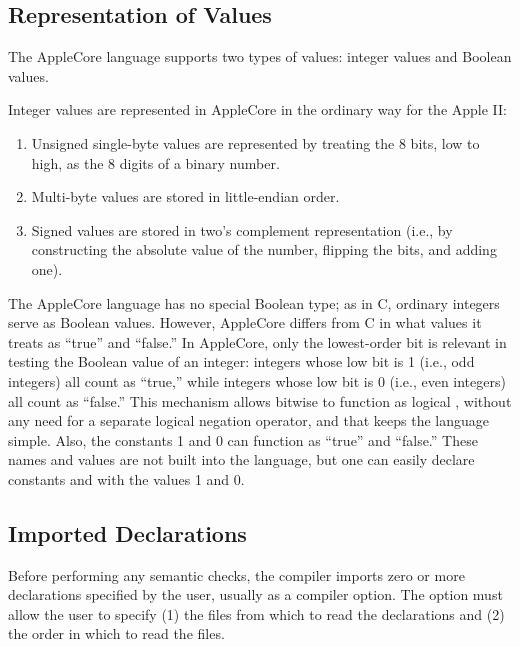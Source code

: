 \documentclass[10pt]{article}
\begin{document}
\subsection{Representation of Values}
\label{sec:semantics:values}

The AppleCore language supports two types of values: integer values
and Boolean values.

 Integer values are represented in AppleCore
in the ordinary way for the Apple II:
%
\begin{enumerate}
%
\item Unsigned single-byte values are represented by treating the 8
  bits, low to high, as the 8 digits of a binary number.
%
\item Multi-byte values are stored in little-endian order.
%
\item Signed values are stored in two's complement representation
  (i.e., by constructing the absolute value of the number, flipping
  the bits, and adding one).
%
\end{enumerate}

 The AppleCore language has no special Boolean
type; as in C, ordinary integers serve as Boolean values.  However,
AppleCore differs from C in what values it treats as ``true'' and
``false.''  In AppleCore, only the lowest-order bit is relevant in
testing the Boolean value of an integer: integers whose low bit is 1
(i.e., odd integers) all count as ``true,'' while integers whose low
bit is 0 (i.e., even integers) all count as ``false.''  This mechanism
allows bitwise  to function as logical , without any
need for a separate logical negation operator, and that keeps the
language simple.  Also, the constants 1 and 0 can function as ``true''
and ``false.''  These names and values are not built into the
language, but one can easily declare constants  and
 with the values 1 and 0.

\subsection{Imported Declarations}
\label{sec:semantics:import}

Before performing any semantic checks, the compiler imports zero or
more declarations specified by the user, usually as a compiler option.
The option must allow the user to specify (1) the files from which to
read the declarations and (2) the order in which to read the files.
\end{document}
